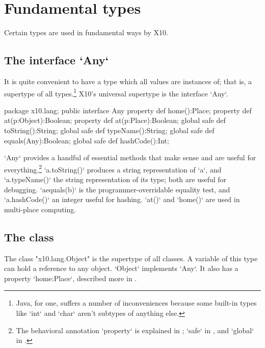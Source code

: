 {{\section{Fundamental types}

Certain types are used in fundamental ways by X10.  

\subsection{The interface \xcd`Any`}

It is quite convenient to have a type which all values are instances of; that
is, a supertype of all types.\footnote{Java, for one, suffers a number of
  inconveniences because some built-in types like \xcd`int` and \xcd`char`
  aren't subtypes of anything else.}  X10's universal supertype is the
  interface \xcd`Any`. 

\begin{xten}
package x10.lang;
public interface Any {
  property def home():Place;
  property def at(p:Object):Boolean;
  property def at(p:Place):Boolean;
  global safe def toString():String;
  global safe def typeName():String;
  global safe def equals(Any):Boolean;
  global safe def hashCode():Int;
}
\end{xten}

\xcd`Any` provides a handful of essential methods that make sense and are
useful for everything.\footnote{The behavioral annotation \xcd`property` is
  explained in ; \xcd`safe` in , and
  \xcd`global` in .} \xcd`a.toString()` produces a
string representation of \xcd`a`, and \xcd`a.typeName()` the string
representation of its type; both are useful for debugging.  \xcd`aequals(b)`
is the programmer-overridable equality test, and \xcd`a.hashCode()` an integer
useful for hashing.  \xcd`at()` and \xcd`home()` are used in multi-place
computing. 


\subsection{The class }
\label{Object}

The class \xcd"x10.lang.Object" is the supertype of all classes.
A variable of this type can hold a reference to any object.
\xcd`Object` implements \xcd`Any`. It also has a property \xcd`home:Place`,
described more in .



}}
